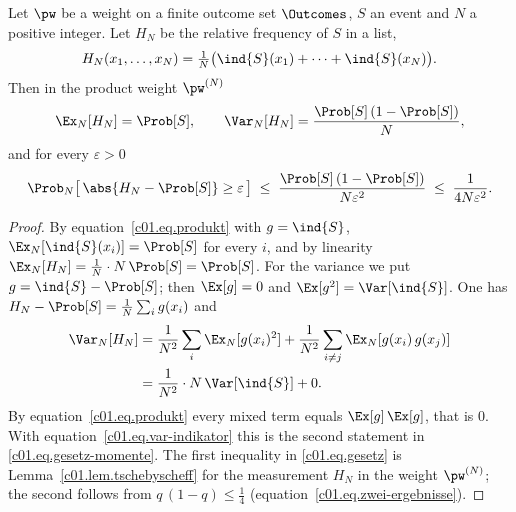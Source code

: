 \begin{vertiefung}
  \begin{theorem}\label{c01.thm.haeufigkeit}
    Let $\pw$ be a weight on a finite outcome set $\Outcomes$, $S$ an event
    and $N$ a positive integer. Let $H_N$ be the relative frequency of $S$ in a list,
    \begin{equation*}
      H_N(x_1, \dots, x_N) = \tfrac{1}{N}\bigl(\ind{S}(x_1) + \dots + \ind{S}(x_N)\bigr) .
    \end{equation*}
    Then in the product weight $\pw^{(N)}$
    \begin{equation}\label{c01.eq.gesetz-momente}
      \Ex_N[H_N] = \Prob[S],
      \qquad
      \Var_N[H_N] = \frac{\Prob[S]\,(1 - \Prob[S])}{N} ,
    \end{equation}
    and for every $\varepsilon > 0$
    \begin{equation}\label{c01.eq.gesetz}
      \Prob_N\bigl[\,\abs{H_N - \Prob[S]} \geq \varepsilon\,\bigr]
      \;\leq\; \frac{\Prob[S]\,(1 - \Prob[S])}{N \varepsilon^2}
      \;\leq\; \frac{1}{4 N \varepsilon^2} .
    \end{equation}
  \end{theorem}
  \begin{proof}
    By equation~\eqref{c01.eq.produkt} with $g = \ind{S}$,
    $\Ex_N[\ind{S}(x_i)] = \Prob[S]$ for every $i$, and by linearity
    $\Ex_N[H_N] = \tfrac{1}{N}\cdot N\, \Prob[S] = \Prob[S]$. For the variance we put
    $g = \ind{S} - \Prob[S]$; then $\Ex[g] = 0$ and $\Ex[g^2] = \Var[\ind{S}]$. One has
    $H_N - \Prob[S] = \tfrac{1}{N}\sum_i g(x_i)$ and
    \begin{equation}\label{c01.eq.gesetz-rechnung}
      \begin{aligned}
        \Var_N[H_N]
        &= \frac{1}{N^2} \sum_{i} \Ex_N[g(x_i)^2]
          + \frac{1}{N^2} \sum_{i \neq j} \Ex_N[g(x_i)\,g(x_j)] \\
        &= \frac{1}{N^2}\cdot N\, \Var[\ind{S}] + 0 .
      \end{aligned}
    \end{equation}
    By equation~\eqref{c01.eq.produkt} every mixed term equals
    $\Ex[g]\,\Ex[g]$, that is $0$. With equation~\eqref{c01.eq.var-indikator} this is the
    second statement in \eqref{c01.eq.gesetz-momente}. The first inequality in
    \eqref{c01.eq.gesetz} is Lemma~\ref{c01.lem.tschebyscheff} for the measurement $H_N$ in
    the weight $\pw^{(N)}$; the second follows from $q\,(1-q) \leq \tfrac14$
    (equation~\eqref{c01.eq.zwei-ergebnisse}).
  \end{proof}


\end{vertiefung}
